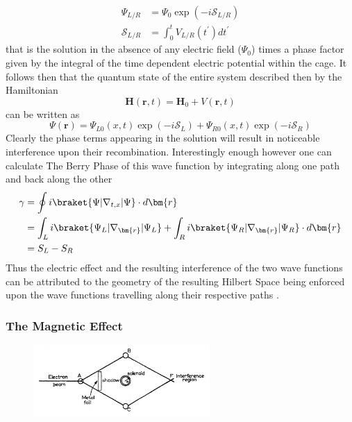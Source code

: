 \documentclass{article}
\begin{document}
\begin{align*}
  \Psi_{L/R} &= \Psi_{0} \exp(-i \mathcal{S}_{L/R})\\
  \mathcal{S}_{L/R} &= \int_{0}^{t} V_{L/R}(t^{\prime}) dt^{\prime} 
\end{align*}
that is the solution in the absence of any electric field ($\Psi_{0}$) times a phase factor given by the integral of the time dependent electric potential within the cage. It follows then that the quantum state of the entire system described then by the Hamiltonian
  \begin{equation*}
    \bm{H}(\bm{r}, t) = \bm{H}_{0} + V(\bm{r}, t)
  \end{equation*}
can be written as
\begin{equation*}
  \Psi(\bm{r})=\Psi_{L0}(x,t)\exp(-i \mathcal{S}_{L}) + \Psi_{R0}(x,t)\exp(-i \mathcal{S}_{R})
\end{equation*}
Clearly the phase terms appearing in the solution will result in noticeable interference upon their recombination. Interestingly enough however one can calculate The Berry Phase of this wave function by integrating along one path and back along the other
\begin{align*}
  \gamma &= \oint i\braket{\Psi|\nabla_{t,x}|\Psi} \cdot d\bm{r}\\
         &= \int_{L} i\braket{\Psi_{L}|\nabla_{\bm{r}}|\Psi_{L}} + \int_{R} i\braket{\Psi_{R}|\nabla_{\bm{r}}|\Psi_{R}} \cdot d\bm{r}\\
         &= S_{L} - S_{R}
\end{align*}
Thus the electric effect and the resulting interference of the two wave functions can be attributed to the geometry of the resulting Hilbert Space being enforced upon the wave functions travelling along their respective paths \cite{Aharonov1959}.

\subsubsection{The Magnetic Effect}\label{sssec:magnetic_effect}

\begin{figure}[h]
  \centering
  \includegraphics[width=0.6\textwidth]{magnetic_effect}
  \label{fig:AME}
\end{figure}
\end{document}
